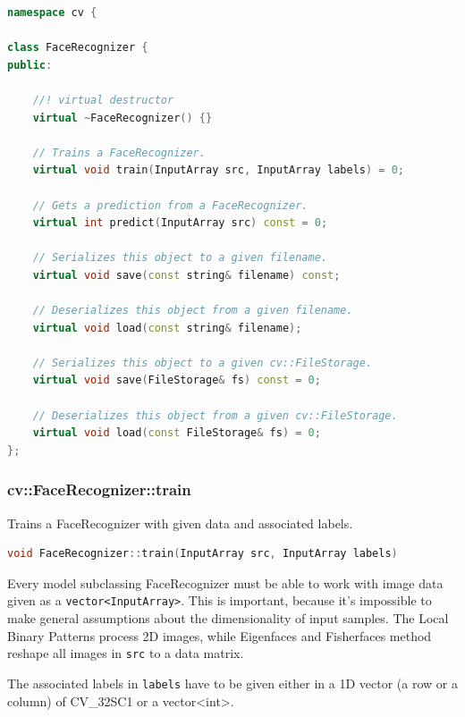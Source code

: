 \begin{lstlisting}[language=c++]
namespace cv {

class FaceRecognizer {
public:

    //! virtual destructor
    virtual ~FaceRecognizer() {}

    // Trains a FaceRecognizer.
    virtual void train(InputArray src, InputArray labels) = 0;

    // Gets a prediction from a FaceRecognizer.
    virtual int predict(InputArray src) const = 0;

    // Serializes this object to a given filename.
    virtual void save(const string& filename) const;

    // Deserializes this object from a given filename.
    virtual void load(const string& filename);

    // Serializes this object to a given cv::FileStorage.
    virtual void save(FileStorage& fs) const = 0;

    // Deserializes this object from a given cv::FileStorage.
    virtual void load(const FileStorage& fs) = 0;
};
\end{lstlisting}

\subsubsection{cv::FaceRecognizer::train}

Trains a FaceRecognizer with given data and associated labels.

\begin{lstlisting}[language=c++]
void FaceRecognizer::train(InputArray src, InputArray labels)
\end{lstlisting}

Every model subclassing FaceRecognizer must be able to work with image data given as a \lstinline|vector<InputArray>|. This is important, because it’s impossible to make general assumptions about the dimensionality of input samples. The Local Binary Patterns process 2D images, while Eigenfaces and Fisherfaces method reshape all images in \lstinline|src| to a data matrix.

The associated labels in \lstinline|labels| have to be given either in a 1D vector (a row or a column) of CV\_32SC1 or a vector<int>.

